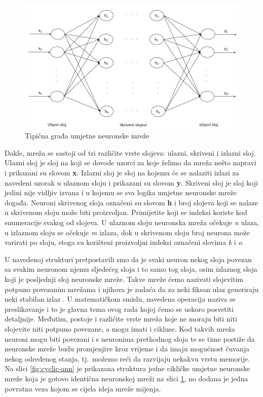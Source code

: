 \documentclass[times, utf8, zavrsni]{fer}
\begin{document}
\begin{figure}[H]
    \centering
    \includegraphics[scale=0.6]{img/ann.png}
    \caption[Caption for LOF]{Tipična građa umjetne neuronske mreže\footnotemark}
    \label{fig:ann}
\end{figure}

Dakle, mreža se sastoji od tri različite vrste slojeva: ulazni, skriveni i izlazni sloj. Ulazni sloj je sloj na koji se dovode uzorci za koje želimo da mreža nešto napravi i prikazani su slovom \textbf{x}. Izlazni sloj je sloj na kojemu će se nalaziti izlazi za navedeni uzorak u ulaznom sloju i prikazani su slovom \textbf{y}. Skriveni sloj je sloj koji jedini nije vidljiv izvana i u kojemu se sva logika umjetne neuronske mreže događa. Neuroni skrivenog sloja označeni su slovom \textbf{h} i broj slojeva koji se nalaze u skrivenom sloju može biti proizvoljan. Primijetite koji se indeksi koriste kod enumeracije svakog od slojeva. U ulaznom sloju neuronska mreža očekuje \textit{n} ulaza, u izlaznom sloju se očekuje \textit{m} izlaza, dok u skrivenom sloju broj neurona može varirati po sloju, stoga su korišteni proizvoljni indeksi označeni slovima \textit{k} i \textit{o}.

U navedenoj strukturi pretpostavili smo da je svaki neuron nekog sloja povezan sa svakim neuronom njemu sljedećeg sloja i to samo tog sloja, osim izlaznog sloja koji je posljednji sloj neuronske mreže. Takve mreže ćemo nazivati slojevitim potpuno povezanim mrežama i njihova je zadaća da za neki fiksan ulaz generiraju neki stabilan izlaz \citep{cupicNENR}. U matematičkom smislu, navedena operacija naziva se preslikavanje i to je glavna tema ovog rada kojoj ćemo se uskoro posvetiti detaljnije. Međutim, postoje i različite vrste mreža koje ne moraju biti niti slojevite niti potpuno povezane, a mogu imati i cikluse. Kod takvih mreža neuroni mogu biti povezani i s neuronima prethodnog sloja te se time postiže da neuronske mreže budu promjenjive kroz vrijeme i da imaju mogućnost čuvanja nekog određenog stanja, tj.\ možemo reći da razvijaju nekakvu vrstu memorije. Na slici \ref{fig:cyclic-ann} je prikazana struktura jedne cikličke umjetne neuronske mreže koja je gotovo identična neuronskoj mreži na slici \ref{fig:ann}, no dodana je jedna povratna veza kojom se cijela ideja mreže mijenja.
\end{document}
